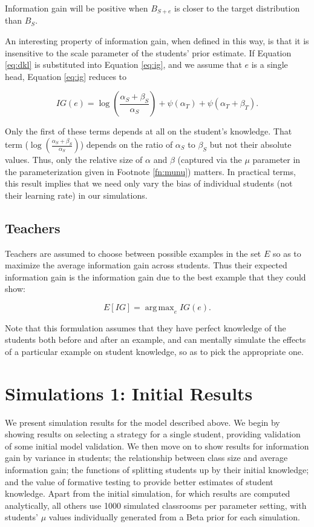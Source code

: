 \documentclass[10pt,letterpaper]{article}
\DeclareMathOperator*{\argmax}{arg\,max}
\begin{document}
\noindent Information gain will be positive when $B_{S+e}$ is closer to the target distribution than $B_S$.

An interesting property of information gain, when defined in this way, is that it is insensitive to the scale parameter of the students' prior estimate. If Equation \ref{eq:dkl} is substituted into Equation \ref{eq:ig}, and we assume that $e$ is a single head, Equation \ref{eq:ig} reduces to

\begin{equation}
IG(e) = \log(\frac{\alpha_S + \beta_S}{\alpha_S}) + \psi (\alpha_T) + \psi (\alpha_T + \beta_T).
\end{equation}

\noindent Only the first of these terms depends at all on the student's knowledge. That term ($\log(\frac{\alpha_S + \beta_S}{\alpha_S})$) depends on the ratio of $\alpha_S$ to $\beta_S$ but not their absolute values. Thus, only the relative size of $\alpha$ and $\beta$ (captured via the $\mu$ parameter in the parameterization given in Footnote \ref{fn:munu}) matters. In practical terms, this result implies that we need only vary the bias of individual students (not their learning rate) in our simulations.

\subsection{Teachers}

Teachers are assumed to choose between possible examples in the set $E$ so as to maximize the average information gain across students. Thus their expected information gain is the information gain due to the best example that they could show:

\begin{equation}
E[IG] = \argmax_e {IG(e)}.
\end{equation}

Note that this formulation assumes that they have perfect knowledge of the students both before and after an example, and can mentally simulate the effects of a particular example on student knowledge, so as to pick the appropriate one. 

\section{Simulations 1: Initial Results}

We present simulation results for the model described above. We begin by showing results on selecting a strategy for a single student, providing validation of some initial model validation. We then move on to show results for information gain by variance in students; the relationship between class size and average information gain; the functions of splitting students up by their initial knowledge; and the value of formative testing to provide better estimates of student knowledge. Apart from the initial simulation, for which results are computed analytically, all others use 1000 simulated classrooms per parameter setting, with students' $\mu$ values individually generated from a Beta prior for each simulation.
\end{document}

